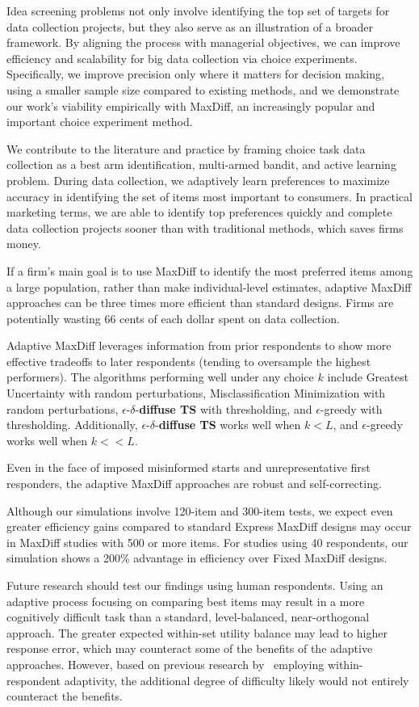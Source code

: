 \documentclass[nonblindrev]{informs3}
\newcommand{\edts}{$\epsilon$-$\delta$-\textbf{diffuse TS} }
\begin{document}
Idea screening problems not only involve identifying the top set of targets for data collection projects, but they also serve as an illustration of a broader framework. By aligning the process with managerial objectives, we can improve efficiency and scalability for big data collection via choice experiments. Specifically, we improve precision only where it matters for decision making, using a smaller sample size compared to existing methods, and we demonstrate our work's viability empirically with MaxDiff, an increasingly popular and important choice experiment method.

We contribute to the literature and practice by framing choice task data collection as a best arm identification, multi-armed bandit, and active learning problem. During data collection, we adaptively learn preferences to maximize accuracy in identifying the set of items most important to consumers. In practical marketing terms, we are able to identify top preferences quickly and complete data collection projects sooner than with traditional methods, which saves firms money. 

If a firm's main goal is to use MaxDiff to identify the most preferred items among a large population, rather than make individual-level estimates, adaptive MaxDiff approaches can be three times more efficient than standard designs. Firms are potentially wasting 66 cents of each dollar spent on data collection.

Adaptive MaxDiff leverages information from prior respondents to show more effective tradeoffs to later respondents (tending to oversample the highest performers). The algorithms performing well under any choice $k$ include Greatest Uncertainty with random perturbations, Misclassification Minimization with random perturbations, \edts with thresholding, and $\epsilon$-greedy with thresholding. Additionally, \edts works well when $k<L$, and $\epsilon$-greedy works well when $k<<L$.

Even in the face of imposed misinformed starts  and unrepresentative first responders, the adaptive MaxDiff approaches are robust and self-correcting.

Although our simulations involve 120-item and 300-item tests, we expect even greater efficiency gains compared to standard Express MaxDiff designs may occur in MaxDiff studies with 500 or more items. For studies using 40 respondents, our simulation shows a 200\% advantage in efficiency over Fixed MaxDiff designs.

Future research should test our findings using human respondents. Using an adaptive process focusing on comparing best items may result in a more cognitively difficult task than a standard, level-balanced, near-orthogonal approach.  The greater expected within-set utility balance may lead to higher response error, which may counteract some of the benefits of the adaptive approaches.  However, based on previous research by~\cite{orme2006adaptive} employing within-respondent adaptivity, the additional degree of difficulty likely would not entirely counteract the benefits.
\end{document}
